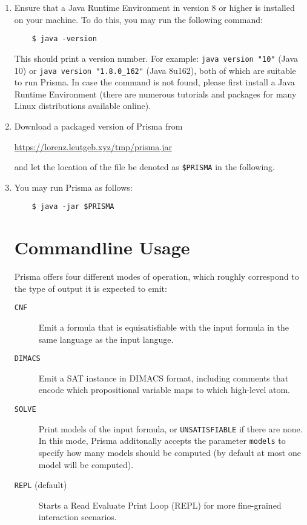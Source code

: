 \documentclass{llncs}
\begin{document}
\begin{enumerate}
	\item{Ensure that a Java Runtime Environment in version 8 or higher is installed on your machine. To do this, you may run the following command:
	\begin{verbatim}
	$ java -version
	\end{verbatim}
	This should print a version number. For example: \texttt{java~version~"10"} (Java 10) or \texttt{java~version~"1.8.0\_162"} (Java 8u162), both of which are suitable to run Prisma. In case the command is not found, please first install a Java Runtime Environment (there are numerous tutorials and packages for many Linux distributions available online).
	}
	\item{Download a packaged version of Prisma from
	\begin{center}
	\url{https://lorenz.leutgeb.xyz/tmp/prisma.jar}
	\end{center} and let the location of the file be denoted as \texttt{\$PRISMA} in the following.}
	\item{You may run Prisma as follows:
	\begin{verbatim}
	$ java -jar $PRISMA
	\end{verbatim}
	}

\section{Commandline Usage}
\label{sec:usage}

Prisma offers four different modes of operation, which roughly correspond to the type of output it is expected to emit:

\begin{description}
	\item[\texttt{CNF}]{Emit a formula that is equisatisfiable with the input formula in the same language as the input languge.}
	\item[\texttt{DIMACS}]{Emit a SAT instance in DIMACS format, including comments that encode which propositional variable maps to which high-level atom.}
	\item[\texttt{SOLVE}]{Print models of the input formula, or \texttt{UNSATISFIABLE} if there are none. In this mode, Prisma additonally accepts the parameter \texttt{models} to specify how many models should be computed (by default at most one model will be computed).}
	\item[\texttt{REPL} \textnormal{(default)}]{Starts a Read Evaluate Print Loop (REPL) for more fine-grained interaction scenarios.}
\end{description}


\end{enumerate}
\end{document}
